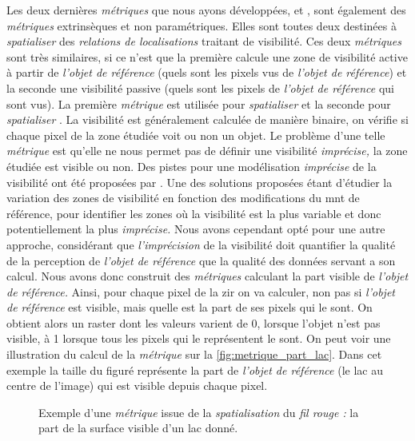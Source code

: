 Les deux dernières \emph{métriques} que nous ayons développées,
 et , sont également des
\emph{métriques} extrinsèques et non paramétriques. Elles sont toutes
deux destinées à \emph{spatialiser} des \emph{relations de
  localisations} traitant de visibilité. Ces deux \emph{métriques}
sont très similaires, si ce n'est que la première calcule une zone de
visibilité active à partir de \emph{l'objet de référence} (\ie quels
sont les pixels vus de \emph{l'objet de référence}) et la seconde une
visibilité passive (\ie quels sont les pixels de \emph{l'objet de
  référence} qui sont vus). La première \emph{métrique} est utilisée
pour \emph{spatialiser}  et la seconde
pour \emph{spatialiser} . La visibilité
est généralement calculée de manière binaire, on vérifie si chaque
pixel de la zone étudiée voit ou non un objet. Le problème d'une telle
\emph{métrique} est qu'elle ne nous permet pas de définir une
visibilité \emph{imprécise,} la zone étudiée est visible ou non. Des
pistes pour une modélisation \emph{imprécise} de la visibilité ont été
proposées par \textcite{Fisher1991,Fisher1992}. Une des solutions
proposées étant d'étudier la variation des zones de visibilité en
fonction des modifications du \ac{mnt} de référence, pour identifier
les zones où la visibilité est la plus variable et donc
potentiellement la plus \emph{imprécise.}  Nous avons cependant opté
pour une autre approche, considérant que \emph{l'imprécision} de la
visibilité doit quantifier la qualité de la perception de
\emph{l'objet de référence} que la qualité des données servant a son
calcul. Nous avons donc construit des \emph{métriques} calculant la
part visible de \emph{l'objet de référence.} Ainsi, pour chaque pixel
de la \ac{zir} on va calculer, non pas si \emph{l'objet de référence}
est visible, mais quelle est la part de ses pixels qui le sont. On
obtient alors un raster dont les valeurs varient de 0, lorsque l'objet
n'est pas visible, à 1 lorsque tous les pixels qui le représentent le
sont. On peut voir une illustration du calcul de la \emph{métrique}
 sur la \autoref{fig:metrique_part_lac}. Dans cet
exemple la taille du figuré représente la part de \emph{l'objet de
  référence} (le lac au centre de l'image) qui est visible depuis
chaque pixel.

\begin{figure}
  \centering
  
  \caption{Exemple d'une \emph{métrique} issue de la
    \emph{spatialisation} du \emph{fil rouge :} la part de la surface
    visible d'un lac donné.}
  \label{fig:metrique_part_lac}
\end{figure}

